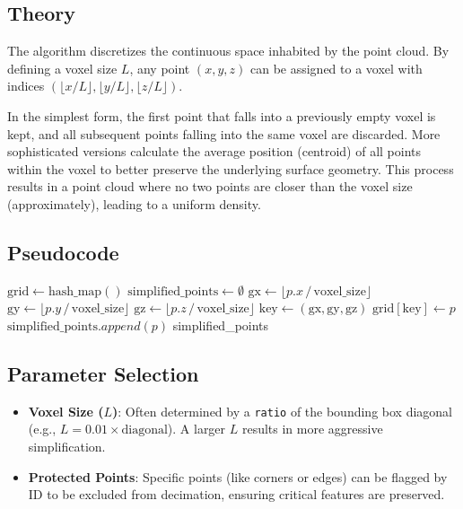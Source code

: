 \subsection{Theory}
The algorithm discretizes the continuous space inhabited by the point cloud. By defining a voxel size $L$, any point $(x, y, z)$ can be assigned to a voxel with indices $(\lfloor x/L \rfloor, \lfloor y/L \rfloor, \lfloor z/L \rfloor)$.

In the simplest form, the first point that falls into a previously empty voxel is kept, and all subsequent points falling into the same voxel are discarded. More sophisticated versions calculate the average position (centroid) of all points within the voxel to better preserve the underlying surface geometry. This process results in a point cloud where no two points are closer than the voxel size (approximately), leading to a uniform density.

\subsection{Pseudocode}
\begin{algorithm}
\caption{Voxel Grid Simplify}
\label{alg:voxel_grid_simplify}
\begin{algorithmic}[1]
    \State $\text{grid} \gets \text{hash\_map}()$
    \State $\text{simplified\_points} \gets \emptyset$
        \State $\text{gx} \gets \lfloor p.x \,/\, \text{voxel\_size} \rfloor$
        \State $\text{gy} \gets \lfloor p.y \,/\, \text{voxel\_size} \rfloor$
        \State $\text{gz} \gets \lfloor p.z \,/\, \text{voxel\_size} \rfloor$
        \State $\text{key} \gets (\text{gx}, \text{gy}, \text{gz})$
                \State $\text{grid}[\text{key}] \gets p$
                \State $\text{simplified\_points}.append(p)$
            \EndIf
        \EndIf
    \EndFor
    \State \Return simplified\_points
\EndFunction
\end{algorithmic}
\end{algorithm}

\subsection{Parameter Selection}
\begin{itemize}
\item \textbf{Voxel Size ($L$)}: Often determined by a \texttt{ratio} of the bounding box diagonal (e.g., $L = 0.01 \times \text{diagonal}$). A larger $L$ results in more aggressive simplification.
\item \textbf{Protected Points}: Specific points (like corners or edges) can be flagged by ID to be excluded from decimation, ensuring critical features are preserved.
\end{itemize}

